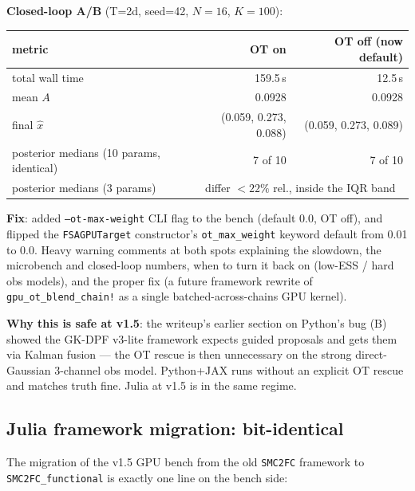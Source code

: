 \documentclass[11pt,a4paper]{article}
\begin{document}
\textbf{Closed-loop A/B} (T=2d, seed=42, $N=16$, $K=100$):

\begin{center}
\begin{tabular}{lrr}
  \toprule
  metric                                   & OT on    & OT off (now default) \\
  \midrule
  total wall time                          & 159.5\,s & 12.5\,s              \\
  mean $A$                                 & 0.0928   & 0.0928               \\
  final $\hat x$                           & (0.059, 0.273, 0.088)
                                                       & (0.059, 0.273, 0.089) \\
  posterior medians (10 params, identical) & 7 of 10  & 7 of 10              \\
  posterior medians (3 params)             &
       \multicolumn{2}{c}{differ $<22\%$ rel., inside the IQR band} \\
  \bottomrule
\end{tabular}
\end{center}

\textbf{Fix}: added \texttt{--ot-max-weight} CLI flag to the bench
(default 0.0, OT off), and flipped the \texttt{FSAGPUTarget}
constructor's \texttt{ot\_max\_weight} keyword default from 0.01
to 0.0. Heavy warning comments at both spots explaining the
slowdown, the microbench and closed-loop numbers, when to turn
it back on (low-ESS / hard obs models), and the proper fix
(a future framework rewrite of \texttt{gpu\_ot\_blend\_chain!}
as a single batched-across-chains GPU kernel).

\textbf{Why this is safe at v1.5}: the writeup's earlier section
on Python's bug (B) showed the GK-DPF v3-lite framework expects
guided proposals and gets them via Kalman fusion --- the OT rescue
is then unnecessary on the strong direct-Gaussian 3-channel obs
model. Python+JAX runs without an explicit OT rescue and matches
truth fine. Julia at v1.5 is in the same regime.

\subsection{Julia framework migration: bit-identical}\label{sec:bug_migration}

The migration of the v1.5 GPU bench from the old \texttt{SMC2FC}
framework to \texttt{SMC2FC\_functional} is exactly one line on the
bench side:
\end{document}
